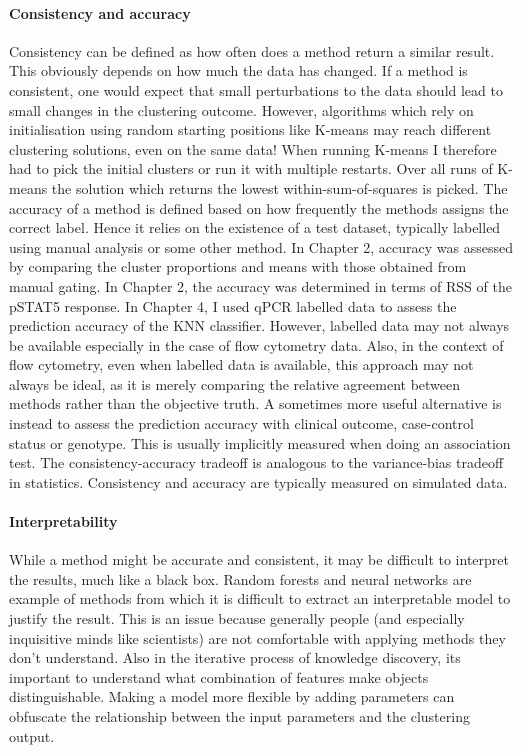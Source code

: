 \paragraph{Consistency and accuracy}
Consistency can be defined as how often does a method return a similar result.
This obviously depends on how much the data has changed.
If a method is consistent, one would expect that small perturbations to the data should lead to small changes in the clustering outcome.
However, algorithms which rely on initialisation using random starting positions like K-means may reach different clustering solutions, even on the same data!
When running K-means I therefore had to pick the initial clusters or run it with multiple restarts.
Over all runs of K-means the solution which returns the lowest within-sum-of-squares is picked.
The accuracy of a method is defined based on how frequently the methods assigns the correct label.
Hence it relies on the existence of a test dataset, typically labelled using manual analysis or some other method.
In Chapter 2, accuracy was assessed by comparing the cluster proportions and means with those obtained from manual gating.
In Chapter 2, the accuracy was determined in terms of RSS of the pSTAT5 response.
In Chapter 4, I used qPCR labelled data to assess the prediction accuracy of the KNN classifier.
However, labelled data may not always be available especially in the case of flow cytometry data.
Also, in the context of flow cytometry, even when labelled data is available, this approach may not always be ideal,
as it is merely comparing the relative agreement between methods rather than the objective truth.
A sometimes more useful alternative is instead to assess the prediction accuracy with clinical outcome, case-control status or genotype.
This is usually implicitly measured when doing an association test.
The consistency-accuracy tradeoff is analogous to the variance-bias tradeoff in statistics.
Consistency and accuracy are typically measured on simulated data.

\paragraph{Interpretability}
While a method might be accurate and consistent, it may be difficult to interpret the results, much like a black box.
Random forests and neural networks are example of methods from which it is difficult to extract an interpretable model to justify the result.
This is an issue because generally people (and especially inquisitive minds like scientists) are not comfortable with applying methods they don’t understand.
Also in the iterative process of knowledge discovery, its important to understand what combination of features make objects distinguishable.
Making a model more flexible by adding parameters can obfuscate the relationship between the input parameters and the clustering output.


